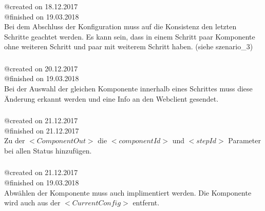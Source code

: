 \documentclass{article}
\begin{document}
\subsubsection{}
@created on 18.12.2017\\
@finished on 19.03.2018\\

Bei dem Abschluss der Konfiguration muss auf die Konsistenz den letzten
Schritte geachtet werden. Es kann sein, dass in einem Schritt paar Komponente
ohne weiteren Schritt und paar mit weiterem Schritt haben. (siehe
szenario\_3)\\

\subsubsection{}
@created on 20.12.2017\\
@finished on 19.03.2018\\

Bei der Auswahl der gleichen Komponente innerhalb eines Schrittes muss 
diese Änderung erkannt werden und eine Info an den Webclient gesendet.\\

\subsubsection{}
@created on 21.12.2017\\
@finished on 21.12.2017\\

Zu der $<ComponentOut>$ die $<componentId>$ und $<stepId>$ Parameter bei
allen Status hinzuf\"ugen.\\

\subsubsection{}
@created on 21.12.2017\\
@finished on 19.03.2018\\

Abw\"ahlen der Komponente muss auch implimentiert werden. Die Komponente wird
auch aus der $<CurrentConfig>$ entfernt.\\
\end{document}
